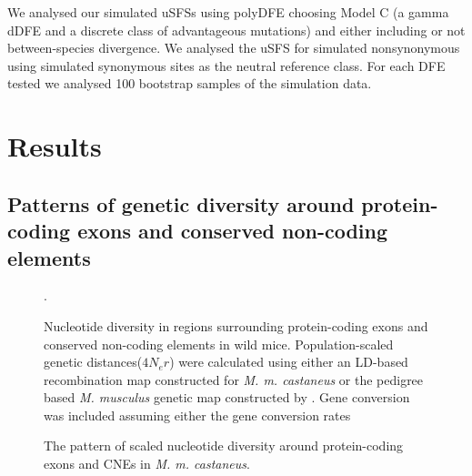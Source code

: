 \documentclass[11pt]{article}
\begin{document}
	 We analysed our simulated uSFSs using polyDFE choosing Model C (a gamma dDFE and a discrete class of advantageous mutations) and either including or not between-species divergence. We analysed the uSFS for simulated nonsynonymous using simulated synonymous sites as the neutral reference class. For each DFE tested we analysed 100 bootstrap samples of the simulation data.
 
 	
%
%


\section*{Results}

\subsection*{Patterns of genetic diversity around protein-coding exons and conserved non-coding elements}

\begin{figure}[h]
   \centering      
   \noindent{}
 \caption{Nucleotide diversity in regions surrounding protein-coding exons and conserved non-coding elements in wild mice. Population-scaled genetic distances($4N_er$) were calculated using either an LD-based recombination map constructed for \textit{M. m. castaneus} or the pedigree based \textit{M. musculus} genetic map constructed by \cite{RN232}. Gene conversion was included assuming either the gene conversion rates }.
 
 \label{fig:sfsExample}
\end{figure}

\linespread{1}
\begin{figure}[h]
   \centering      
   \noindent{}
 \caption{The pattern of scaled nucleotide diversity around protein-coding exons and CNEs in \textit{M. m. castaneus}.}  
 
 \label{fig:castaneusFit}
\end{figure}
\end{document}
